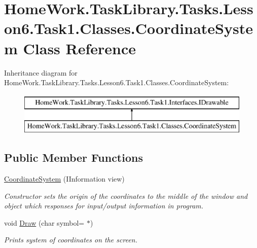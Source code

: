 \hypertarget{class_home_work_1_1_task_library_1_1_tasks_1_1_lesson6_1_1_task1_1_1_classes_1_1_coordinate_system}{}\section{Home\+Work.\+Task\+Library.\+Tasks.\+Lesson6.\+Task1.\+Classes.\+Coordinate\+System Class Reference}
\label{class_home_work_1_1_task_library_1_1_tasks_1_1_lesson6_1_1_task1_1_1_classes_1_1_coordinate_system}
Inheritance diagram for Home\+Work.\+Task\+Library.\+Tasks.\+Lesson6.\+Task1.\+Classes.\+Coordinate\+System\+:\begin{figure}[H]
\begin{center}
\leavevmode
\includegraphics[height=2.000000cm]{class_home_work_1_1_task_library_1_1_tasks_1_1_lesson6_1_1_task1_1_1_classes_1_1_coordinate_system}
\end{center}
\end{figure}
\subsection*{Public Member Functions}
\begin{DoxyCompactItemize}
\item 
\mbox{\hyperlink{class_home_work_1_1_task_library_1_1_tasks_1_1_lesson6_1_1_task1_1_1_classes_1_1_coordinate_system_a7daf4d2ec2071bf190439d75169593fe}{Coordinate\+System}} (I\+Information view)
\begin{DoxyCompactList}\small\item\em Constructor sets the origin of the coordinates to the middle of the window and object which responses for input/output information in program. \end{DoxyCompactList}\item 
void \mbox{\hyperlink{class_home_work_1_1_task_library_1_1_tasks_1_1_lesson6_1_1_task1_1_1_classes_1_1_coordinate_system_aec1491abf6151bb7676e57e6ba971182}{Draw}} (char symbol=\textquotesingle{} $\ast$\textquotesingle{})
\begin{DoxyCompactList}\small\item\em Prints system of coordinates on the screen. \end{DoxyCompactList}\end{DoxyCompactItemize}
